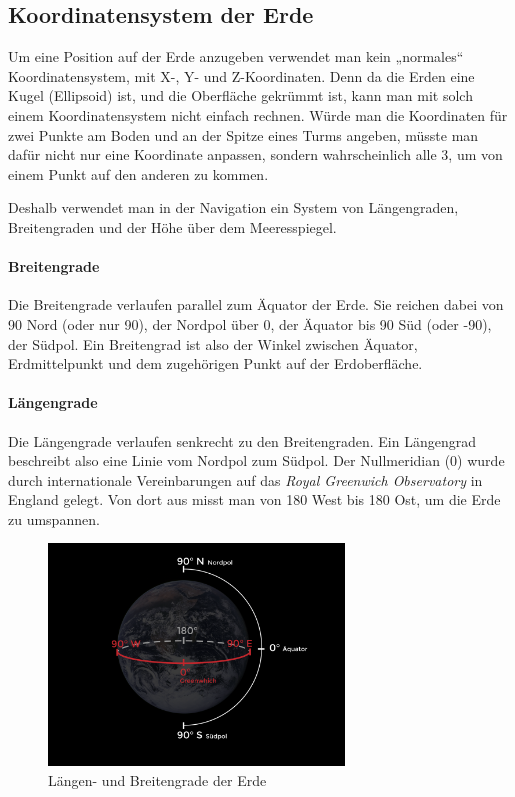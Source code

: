 \documentclass[12pt,a4paper]{scrartcl}
\begin{document}
\subsection{Koordinatensystem der Erde}
Um eine Position auf der Erde anzugeben verwendet man kein „normales“ Koordinatensystem, mit X-, Y- und Z-Koordinaten. Denn da die Erden eine Kugel (Ellipsoid) ist, und die Oberfläche gekrümmt ist, kann man mit solch einem Koordinatensystem nicht einfach rechnen. Würde man die Koordinaten für zwei Punkte am Boden und an der Spitze eines Turms angeben, müsste man dafür nicht nur eine Koordinate anpassen, sondern wahrscheinlich alle 3, um von einem Punkt auf den anderen zu kommen.

Deshalb verwendet man in der Navigation ein System von Längengraden, Breitengraden und der Höhe über dem Meeresspiegel.

\paragraph{Breitengrade} Die Breitengrade verlaufen parallel zum Äquator der Erde. Sie reichen dabei von 90\degree{} Nord (oder nur 90\degree), der Nordpol über 0\degree, der Äquator bis 90\degree{} Süd (oder -90\degree), der Südpol. Ein Breitengrad ist also der Winkel zwischen Äquator, Erdmittelpunkt und dem zugehörigen Punkt auf der Erdoberfläche.

\paragraph{Längengrade}
Die Längengrade verlaufen senkrecht zu den Breitengraden. Ein Längengrad beschreibt also eine Linie vom Nordpol zum Südpol. Der Nullmeridian (0\degree{}) wurde durch internationale Vereinbarungen auf das \emph{Royal Greenwich Observatory} in England gelegt. Von dort aus misst man von 180\degree{} West bis 180\degree{} Ost, um die Erde zu umspannen.

\begin{figure}
\centering
\includegraphics[width=0.7\textwidth]{img/latlong-01.png}
\caption{Längen- und Breitengrade der Erde}
\end{figure}
\end{document}
